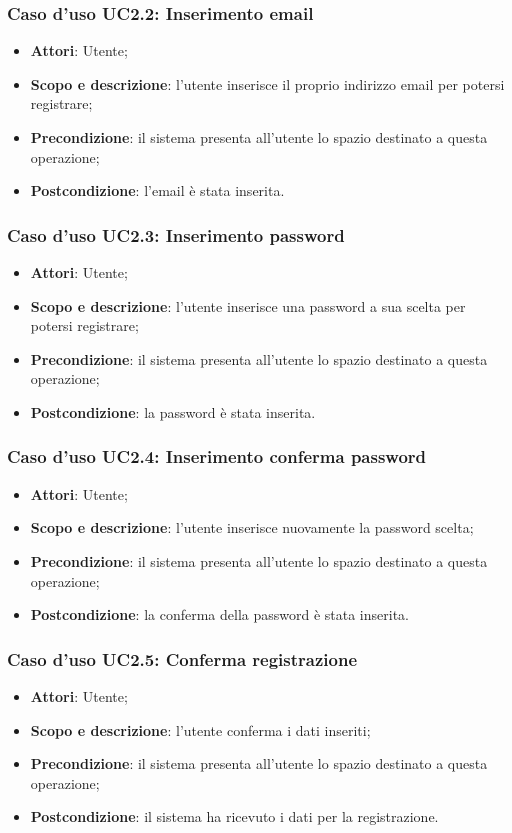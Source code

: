\subsubsection{Caso d'uso UC2.2: Inserimento email}
\begin{itemize}
\item \textbf{Attori}: Utente;
\item \textbf{Scopo e descrizione}: l'utente inserisce il proprio indirizzo email per potersi registrare;
\item \textbf{Precondizione}: il sistema presenta all'utente lo spazio destinato a questa operazione;
\item \textbf{Postcondizione}: l'email è stata inserita.
\end{itemize}

\subsubsection{Caso d'uso UC2.3: Inserimento password}
\begin{itemize}
\item \textbf{Attori}: Utente;
\item \textbf{Scopo e descrizione}: l'utente inserisce una password a sua scelta per potersi registrare;
\item \textbf{Precondizione}: il sistema presenta all'utente lo spazio destinato a questa operazione;
\item \textbf{Postcondizione}: la password è stata inserita.
\end{itemize}

\subsubsection{Caso d'uso UC2.4: Inserimento conferma password}
\begin{itemize}
\item \textbf{Attori}: Utente;
\item \textbf{Scopo e descrizione}: l'utente inserisce nuovamente la password scelta;
\item \textbf{Precondizione}: il sistema presenta all'utente lo spazio destinato a questa operazione;
\item \textbf{Postcondizione}: la conferma della password è stata inserita.
\end{itemize}

\subsubsection{Caso d'uso UC2.5: Conferma registrazione}
\begin{itemize}
\item \textbf{Attori}: Utente;
\item \textbf{Scopo e descrizione}: l'utente conferma i dati inseriti;
\item \textbf{Precondizione}: il sistema presenta all'utente lo spazio destinato a questa operazione;
\item \textbf{Postcondizione}: il sistema ha ricevuto i dati per la registrazione.
\end{itemize}


